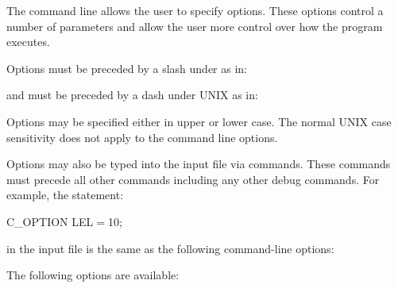 The  command line allows the user to specify options.   These options
control a number of parameters and allow the user more control over how
the  program executes.

Options must be preceded by a slash under  as in:
\begin{codeexample}
\end{codeexample}
and must be preceded by a dash under {\acronym UNIX} as in:
\begin{codeexample}
\end{codeexample}

Options may be specified either in upper or lower case.   The normal UNIX
case sensitivity does not apply to the  command line options.

Options may also be typed into the input file via  commands.
These commands must precede all other commands including any other debug
commands.   For example, the statement:
\begin{codeexample}
C_OPTION LEL\(=\)10;
\end{codeexample}
in the input file is the same as the following command-line options:
\begin{codeexample}
\orline{3mm}
\end{codeexample}

The following options are available:

